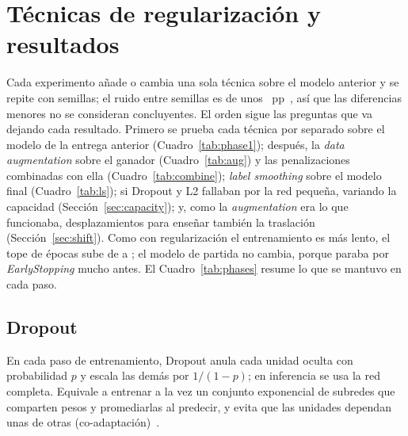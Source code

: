 \section{Técnicas de regularización y resultados}
Cada experimento añade o cambia una sola técnica sobre el modelo anterior y se repite con  semillas;
el ruido entre semillas es de unos ~pp~\cite{bouthillier}, así que las diferencias menores no se
consideran concluyentes. El orden sigue las preguntas que va dejando cada resultado. Primero se prueba cada técnica
por separado sobre el modelo de la entrega anterior (Cuadro~\ref{tab:phase1}); después, la \emph{data augmentation}
sobre el ganador (Cuadro~\ref{tab:aug}) y las penalizaciones combinadas con ella (Cuadro~\ref{tab:combine});
\emph{label smoothing} sobre el modelo final (Cuadro~\ref{tab:ls}); si Dropout y L2 fallaban por la red pequeña,
variando la capacidad (Sección~\ref{sec:capacity}); y, como la \emph{augmentation} era lo que funcionaba,
desplazamientos para enseñar también la traslación (Sección~\ref{sec:shift}). Como con regularización el entrenamiento es más lento,
el tope de épocas sube de  a ; el modelo de partida no cambia,
porque paraba por \emph{EarlyStopping} mucho antes. El Cuadro~\ref{tab:phases} resume lo que se mantuvo en cada paso.

\begin{table}[h]
  \centering\small
  \caption{Configuración que se mantiene tras cada paso (validación; media $\pm$ desviación típica).}
  \label{tab:phases}
\end{table}

\begin{table}[h]
  \centering
  \caption{Cada técnica por separado sobre el modelo de la entrega 1 ( semillas por fila; brecha =
  \emph{accuracy} de train $-$ \emph{accuracy} de validación).}
  \label{tab:phase1}
\end{table}

\subsection{Dropout}
En cada paso de entrenamiento, Dropout anula cada unidad oculta con probabilidad $p$ y escala las demás por
$1/(1-p)$; en inferencia se usa la red completa. Equivale a entrenar a la vez un conjunto exponencial de subredes que
comparten pesos y promediarlas al predecir, y evita que las unidades dependan unas de otras
(co-adaptación)~\cite{srivastava,goodfellow}.

